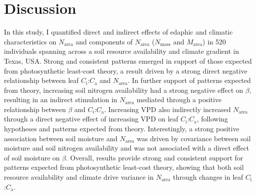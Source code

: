 \section{Discussion}
\noindent In this study, I quantified direct and indirect effects of edaphic and climatic characteristics on $N_\mathrm{area}$ and components of $N_\mathrm{area}$ ($N_\mathrm{mass}$ and $M_\mathrm{area}$) in 520 individuals spanning across a soil resource availability and climate gradient in Texas, USA. Strong and consistent patterns emerged in support of those expected from photosynthetic least-cost theory, a result driven by a strong direct negative relationship between leaf $C_\mathrm{i}$:$C_\mathrm{a}$ and $N_\mathrm{area}$. In further support of patterns expected from theory, increasing soil nitrogen availability had a strong negative effect on $\beta$, resulting in an indirect stimulation in $N_\mathrm{area}$ mediated through a positive relationship between $\beta$ and $C_\mathrm{i}$:$C_\mathrm{a}$. Increasing VPD also indirectly increased $N_\mathrm{area}$ through a direct negative effect of increasing VPD on leaf $C_\mathrm{i}$:$C_\mathrm{a}$, following hypotheses and patterns expected from theory. Interestingly, a strong positive association between soil moisture and $N_\mathrm{area}$ was driven by covariance between soil moisture and soil nitrogen availability and was not associated with a direct effect of soil moisture on $\beta$. Overall, results provide strong and consistent support for patterns expected from photosynthetic least-cost theory, showing that both soil resource availability and climate drive variance in $N_\mathrm{area}$ through changes in leaf $C_\mathrm{i}$:$C_\mathrm{a}$.

